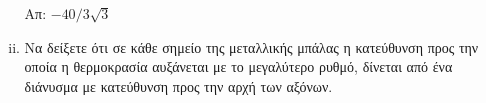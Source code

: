 \begin{enumerate}
\begin{enumerate}[i)]
        \hfill Απ: $ - 40 /3 \sqrt{3} $ 
      \item Να δείξετε ότι σε κάθε σημείο της μεταλλικής μπάλας η κατεύθυνση προς την
        οποία η θερμοκρασία αυξάνεται με το μεγαλύτερο ρυθμό, δίνεται από ένα διάνυσμα 
        με κατεύθυνση προς την αρχή των αξόνων.
    \end{enumerate}
\end{enumerate}


  
